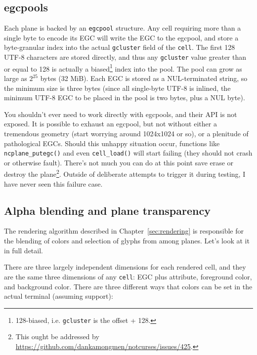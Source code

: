 \subsection{egcpools}
\label{sec:egcpools}
Each plane is backed by an \texttt{egcpool} structure. Any cell requiring more
than a single byte to encode its EGC will write the EGC to the egcpool, and
store a byte-granular index into the actual \texttt{gcluster} field of the
\texttt{cell}. The first 128 UTF-8 characters are stored directly, and thus
any \texttt{gcluster} value greater than or equal to 128 is actually a
biased\footnote{128-biased, i.e. \texttt{gcluster} is the offset + 128.}
index into the pool. The pool can grow as large as $2^{25}$ bytes (32 MiB).
Each EGC is stored as a NUL-terminated string, so the minimum size is three
bytes (since all single-byte UTF-8 is inlined, the minimum UTF-8 EGC to be
placed in the pool is two bytes, plus a NUL byte).

You shouldn't ever need to work directly with egcpools, and their API is not
exposed. It is possible to exhaust an egcpool, but not without either a tremendous
geometry (start worrying around 1024x1024 or so), or a plenitude of pathological
EGCs. Should this unhappy situation occur, functions like \texttt{ncplane\_putegc()}
and even \texttt{cell\_load()} will start failing (they should not crash or otherwise
fault). There's not much you can do at this point save erase or destroy the plane\footnote{This
ought be addressed by \url{https://github.com/dankamongmen/notcurses/issues/425}.}.
Outside of deliberate attempts to trigger it during testing, I have never seen
this failure case.

\subsection{Alpha blending and plane transparency}
\label{sec:alpha}
The rendering algorithm described in Chapter~\ref{sec:rendering} is responsible
for the blending of colors and selection of glyphs from among planes. Let's look
at it in full detail.

There are three largely independent dimensions for each rendered cell, and they
are the same three dimensions of any \texttt{cell}: EGC plus attribute, foreground
color, and background color. There are three different ways that colors can be
set in the actual terminal (assuming support):


